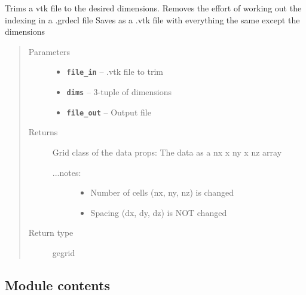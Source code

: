 \documentclass[letterpaper,10pt,english]{sphinxmanual}
\begin{document}

\begin{fulllineitems}
\label{hyvr:hyvr.hyvr.utils.vtk_trim}
Trims a vtk file to the desired dimensions.
Removes the effort of working out the indexing in a .grdecl file
Saves as a .vtk file with everything the same except the dimensions
\begin{quote}\begin{description}
\item[{Parameters}] \leavevmode\begin{itemize}
\item {} 
\textbf{\texttt{file\_in}} -- .vtk file to trim

\item {} 
\textbf{\texttt{dims}} -- 3-tuple of dimensions

\item {} 
\textbf{\texttt{file\_out}} -- Output file

\end{itemize}

\item[{Returns}] \leavevmode

Grid class of the data
props:          The data as a nx x ny x nz array
\begin{description}
\item[{...notes:}] \leavevmode\begin{itemize}
\item {} 
Number of cells (nx, ny, nz) is changed

\item {} 
Spacing (dx, dy, dz) is NOT changed

\end{itemize}

\end{description}


\item[{Return type}] \leavevmode
gegrid

\end{description}\end{quote}

\end{fulllineitems}



\subsection{Module contents}
\label{hyvr:module-contents}\label{hyvr:module-hyvr.hyvr}
\end{document}
